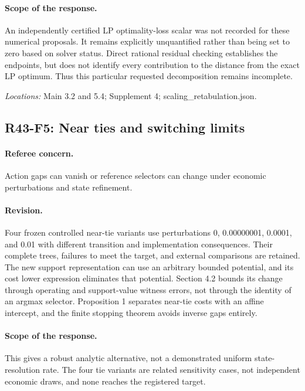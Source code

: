 \paragraph*{Scope of the response.} An independently certified LP optimality-loss scalar was not recorded for these numerical proposals. It remains explicitly unquantified rather than being set to zero based on solver status. Direct rational residual checking establishes the endpoints, but does not identify every contribution to the distance from the exact LP optimum. Thus this particular requested decomposition remains incomplete.

\noindent\textit{Locations:} Main 3.2 and 5.4; Supplement 4; scaling\_retabulation.json.

\subsection{R43-F5: Near ties and switching limits}
\paragraph*{Referee concern.} Action gaps can vanish or reference selectors can change under economic perturbations and state refinement.

\paragraph*{Revision.} Four frozen controlled near-tie variants use perturbations 0, 0.00000001, 0.0001, and 0.01 with different transition and implementation consequences. Their complete trees, failures to meet the target, and external comparisons are retained. The new support representation can use an arbitrary bounded potential, and its cost lower expression eliminates that potential. Section 4.2 bounds its change through operating and support-value witness errors, not through the identity of an argmax selector. Proposition 1 separates near-tie costs with an affine intercept, and the finite stopping theorem avoids inverse gaps entirely.

\paragraph*{Scope of the response.} This gives a robust analytic alternative, not a demonstrated uniform state-resolution rate. The four tie variants are related sensitivity cases, not independent economic draws, and none reaches the registered target.

